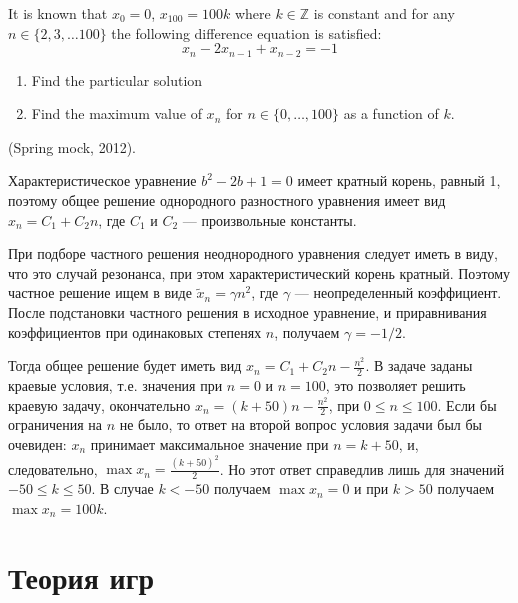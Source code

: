 \begin{problem}
 It is known that $x_0=0$, $x_{100}=100k$ where $k\in \mathbb{Z}$ is constant and for any $n\in\{2,3,\ldots 100\}$ the following difference equation is satisfied:
\[ x_n-2x_{n-1}+x_{n-2}=-1 \]
\begin{enumerate}
\item Find the particular solution
\item Find the maximum value of $x_n$ for $n\in\{0,\ldots,100\}$ as a function of $k$.
\end{enumerate}
(Spring mock, 2012).


\begin{sol}
Характеристическое уравнение  $b^2-2b+1=0$ имеет кратный корень, равный 1,  поэтому общее решение однородного разностного уравнения имеет вид  $x_n=C_1+C_2 n$, где $C_1$  и $C_2$ --- произвольные константы.

При подборе частного решения неоднородного уравнения следует иметь в виду, что это случай резонанса, при этом характеристический корень кратный. Поэтому частное решение ищем в виде  $\tilde{x}_n=\gamma n^2$, где $\gamma$  --- неопределенный коэффициент. После подстановки частного решения в исходное уравнение, и приравнивания коэффициентов при одинаковых степенях $n$, получаем  $\gamma=-1/2$.

Тогда общее решение будет иметь вид   $x_n=C_1+C_2 n-\frac{n^2}{2}$. В задаче заданы краевые условия, т.е. значения   при $n=0$  и $n=100$, это позволяет решить краевую задачу, окончательно $x_n=(k+50) n-\frac{n^2}{2}$, при $0\leq n\leq 100$. Если бы ограничения на  $n$ не было, то ответ на второй вопрос условия задачи был бы очевиден:  $x_n$ принимает максимальное значение при $n=k+50$, и, следовательно,  $\max x_n=\frac{(k+50)^2}{2}$. Но этот ответ справедлив лишь для значений  $-50\leq k \leq 50$. В случае $k< -50$ получаем $\max x_n=0$ и при   $k> 50$ получаем  $\max x_n=100k$.
\end{sol}
\end{problem}


\section{Теория игр}


